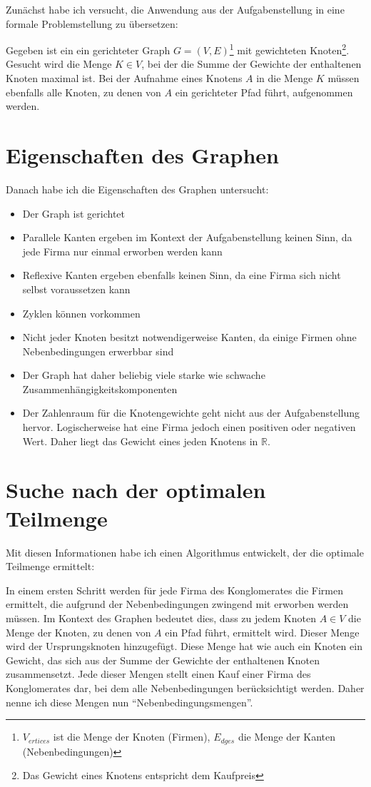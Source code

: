 Zunächst habe ich versucht, die Anwendung aus der Aufgabenstellung in eine formale Problemstellung zu übersetzen:
\begin{displayquote}
	Gegeben ist ein ein gerichteter Graph \(G=(V,E)\)\footnote{\(V_{ertices}\) ist die Menge der Knoten (Firmen), \(E_{dges}\) die Menge der Kanten (Nebenbedingungen)} mit gewichteten Knoten\footnote{Das Gewicht eines Knotens entspricht dem Kaufpreis}. Gesucht wird die Menge \(K \in V\), bei der die Summe der Gewichte der enthaltenen Knoten maximal ist. Bei der Aufnahme eines Knotens  \(A\) in die Menge \(K\) müssen ebenfalls alle Knoten, zu denen von \(A\) ein gerichteter Pfad führt, aufgenommen werden.
\end{displayquote}

\section{Eigenschaften des Graphen}
Danach habe ich die Eigenschaften des Graphen untersucht:
\begin{itemize}
	\item Der Graph ist gerichtet
	\item Parallele Kanten ergeben im Kontext der Aufgabenstellung keinen Sinn, da jede Firma nur einmal erworben werden kann
	\item Reflexive Kanten ergeben ebenfalls keinen Sinn, da eine Firma sich nicht selbst voraussetzen kann
	\item Zyklen können vorkommen
	\item Nicht jeder Knoten besitzt notwendigerweise Kanten, da einige Firmen ohne Nebenbedingungen erwerbbar sind
	\item Der Graph hat daher beliebig viele starke wie schwache Zusammenhängigkeitskomponenten
	\item Der Zahlenraum für die Knotengewichte geht nicht aus der Aufgabenstellung hervor. Logischerweise hat eine Firma jedoch einen positiven oder negativen Wert. Daher liegt das Gewicht eines jeden Knotens in \(\mathbb{R}\).
\end{itemize}

\section{Suche nach der optimalen Teilmenge}
Mit diesen Informationen habe ich einen Algorithmus entwickelt, der die optimale Teilmenge ermittelt:

In einem ersten Schritt werden für jede Firma des Konglomerates die Firmen ermittelt, die aufgrund der Nebenbedingungen zwingend mit erworben werden müssen. Im Kontext des Graphen bedeutet dies, dass zu jedem Knoten \(A \in V\) die Menge der Knoten, zu denen von \(A\) ein Pfad führt, ermittelt wird. 
Dieser Menge wird der Ursprungsknoten hinzugefügt. Diese Menge hat wie auch ein Knoten ein Gewicht, das sich aus der Summe der Gewichte der enthaltenen Knoten zusammensetzt. Jede dieser Mengen stellt einen Kauf einer Firma des Konglomerates dar, bei dem alle Nebenbedingungen berücksichtigt werden. Daher nenne ich diese Mengen nun "`Nebenbedingungsmengen"'.

